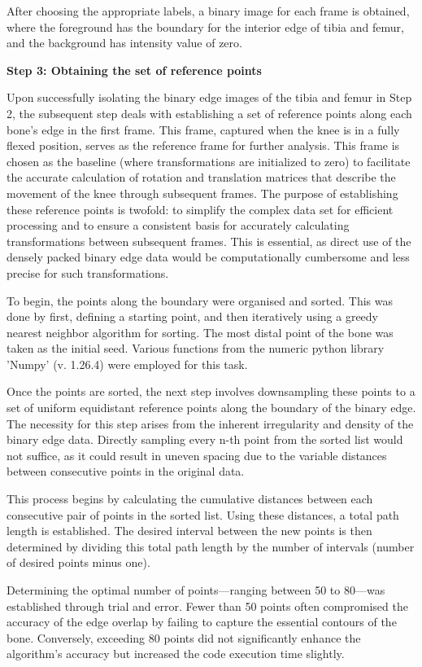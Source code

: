 \documentclass{micro-econ-thesis}
\begin{document}
After choosing the appropriate labels, a binary image for each frame is obtained, where the foreground has the boundary for the interior edge of tibia and femur, and the background has intensity value of zero.   

\textbf{Step 3: Obtaining the set of reference points}

Upon successfully isolating the binary edge images of the tibia and femur in Step 2, the subsequent step deals with establishing a set of reference points along each bone's edge in the first frame. This frame, captured when the knee is in a fully flexed position, serves as the reference frame for further analysis.  This frame is chosen as the baseline (where transformations are initialized to zero) to facilitate the accurate calculation of rotation and translation matrices that describe the movement of the knee through subsequent frames. The purpose of establishing these reference points is twofold: to simplify the complex data set for efficient processing and to ensure a consistent basis for accurately calculating transformations between subsequent frames. This is essential, as direct use of the densely packed binary edge data would be computationally cumbersome and less precise for such transformations.

To begin, the points along the boundary were organised and sorted. This was done by first, defining a starting point, and then iteratively using a greedy nearest neighbor algorithm for sorting. The most distal point of the bone was taken as the initial seed. Various functions from the numeric python library 'Numpy' (v. 1.26.4) were employed for this task. 


Once the points are sorted, the next step involves downsampling these points to a set of uniform equidistant reference points along the boundary of the binary edge. The necessity for this step arises from the inherent irregularity and density of the binary edge data. Directly sampling every n-th point from the sorted list would not suffice, as it could result in uneven spacing due to the variable distances between consecutive points in the original data.

This process begins by calculating the cumulative distances between each consecutive pair of points in the sorted list. Using these distances, a total path length is established. The desired interval between the new points is then determined by dividing this total path length by the number of intervals (number of desired points minus one). 

Determining the optimal number of points—ranging between 50 to 80—was established through trial and error. Fewer than 50 points often compromised the accuracy of the edge overlap by failing to capture the essential contours of the bone. Conversely, exceeding 80 points did not significantly enhance the algorithm's accuracy but increased the code execution time slightly. 
\end{document}
